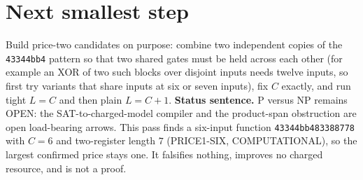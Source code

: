 \documentclass[11pt]{article}
\begin{document}
\section*{Next smallest step}
Build price-two candidates on purpose: combine two independent copies of the \texttt{43344bb4} pattern so that two shared gates must be held across each other (for example an XOR of two such blocks over disjoint inputs needs twelve inputs, so first try variants that share inputs at six or seven inputs), fix $C$ exactly, and run tight $L=C$ and then plain $L=C+1$.
\bigskip
\noindent\textbf{Status sentence.} P versus NP remains OPEN: the SAT-to-charged-model compiler and the product-span obstruction are open load-bearing arrows. This pass finds a six-input function \texttt{43344bb483388778} with $C=6$ and two-register length $7$ (PRICE1-SIX, COMPUTATIONAL), so the largest confirmed price stays one. It falsifies nothing, improves no charged resource, and is not a proof.
\end{document}
